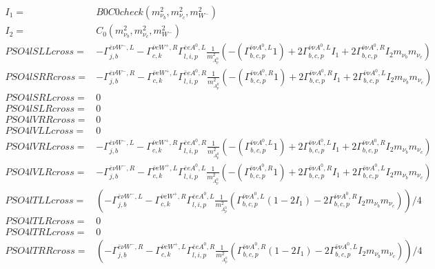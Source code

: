 \documentclass[A4,landscape]{article}
\begin{document}
\begin{align} 
I_1= & B0C0check(m^2_{\nu_{{b}}}, m^2_{\nu_{{c}}}, m^2_{W^-}) \\ 
I_2= & C_0(m^2_{\nu_{{b}}}, m^2_{\nu_{{c}}}, m^2_{W^-}) \\ 
  PSO4lSLLcross= &  - \Gamma^{\bar{e}\nu W^- ,L} _{j, b} - \Gamma^{\bar{\nu}e W^+,R} _{c, k} \Gamma^{\bar{e}e A^0 ,L}_{l, i, p} \frac{1}{m^2_{A^0_{{p}}}} (-(\Gamma^{\bar{\nu}\nu A^0 ,L}_{b, c, p} 1) + 2 \Gamma^{\bar{\nu}\nu A^0 ,L}_{b, c, p} I_1 + 2 \Gamma^{\bar{\nu}\nu A^0 ,R}_{b, c, p} I_2 m_{\nu_{{b}}} m_{\nu_{{c}}}) \\ 
  PSO4lSRRcross= &  - \Gamma^{\bar{e}\nu W^- ,R} _{j, b} - \Gamma^{\bar{\nu}e W^+,L} _{c, k} \Gamma^{\bar{e}e A^0 ,R}_{l, i, p} \frac{1}{m^2_{A^0_{{p}}}} (-(\Gamma^{\bar{\nu}\nu A^0 ,R}_{b, c, p} 1) + 2 \Gamma^{\bar{\nu}\nu A^0 ,R}_{b, c, p} I_1 + 2 \Gamma^{\bar{\nu}\nu A^0 ,L}_{b, c, p} I_2 m_{\nu_{{b}}} m_{\nu_{{c}}}) \\ 
  PSO4lSRLcross= & 0 \\ 
  PSO4lSLRcross= & 0 \\ 
  PSO4lVRRcross= & 0 \\ 
  PSO4lVLLcross= & 0 \\ 
  PSO4lVRLcross= &  - \Gamma^{\bar{e}\nu W^- ,L} _{j, b} - \Gamma^{\bar{\nu}e W^+,R} _{c, k} \Gamma^{\bar{e}e A^0 ,R}_{l, i, p} \frac{1}{m^2_{A^0_{{p}}}} (-(\Gamma^{\bar{\nu}\nu A^0 ,L}_{b, c, p} 1) + 2 \Gamma^{\bar{\nu}\nu A^0 ,L}_{b, c, p} I_1 + 2 \Gamma^{\bar{\nu}\nu A^0 ,R}_{b, c, p} I_2 m_{\nu_{{b}}} m_{\nu_{{c}}}) \\ 
  PSO4lVLRcross= &  - \Gamma^{\bar{e}\nu W^- ,R} _{j, b} - \Gamma^{\bar{\nu}e W^+,L} _{c, k} \Gamma^{\bar{e}e A^0 ,L}_{l, i, p} \frac{1}{m^2_{A^0_{{p}}}} (-(\Gamma^{\bar{\nu}\nu A^0 ,R}_{b, c, p} 1) + 2 \Gamma^{\bar{\nu}\nu A^0 ,R}_{b, c, p} I_1 + 2 \Gamma^{\bar{\nu}\nu A^0 ,L}_{b, c, p} I_2 m_{\nu_{{b}}} m_{\nu_{{c}}}) \\ 
  PSO4lTLLcross= & ( - \Gamma^{\bar{e}\nu W^- ,L} _{j, b} - \Gamma^{\bar{\nu}e W^+,R} _{c, k} \Gamma^{\bar{e}e A^0 ,L}_{l, i, p} \frac{1}{m^2_{A^0_{{p}}}} (\Gamma^{\bar{\nu}\nu A^0 ,L}_{b, c, p} (1 - 2 I_1) - 2 \Gamma^{\bar{\nu}\nu A^0 ,R}_{b, c, p} I_2 m_{\nu_{{b}}} m_{\nu_{{c}}}))/4 \\ 
  PSO4lTLRcross= & 0 \\ 
  PSO4lTRLcross= & 0 \\ 
  PSO4lTRRcross= & ( - \Gamma^{\bar{e}\nu W^- ,R} _{j, b} - \Gamma^{\bar{\nu}e W^+,L} _{c, k} \Gamma^{\bar{e}e A^0 ,R}_{l, i, p} \frac{1}{m^2_{A^0_{{p}}}} (\Gamma^{\bar{\nu}\nu A^0 ,R}_{b, c, p} (1 - 2 I_1) - 2 \Gamma^{\bar{\nu}\nu A^0 ,L}_{b, c, p} I_2 m_{\nu_{{b}}} m_{\nu_{{c}}}))/4 \\ 
\end{align} 
\end{document}
